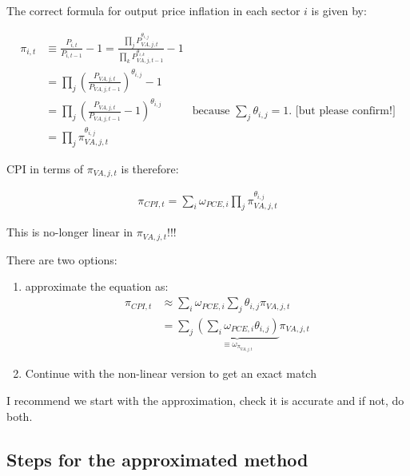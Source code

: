 \documentclass[12pt,english]{article}
\begin{document}
The correct formula for output price inflation in each sector $i$ is given by:

\begin{align*}
	\pi_{i,t} &\equiv \frac{P_{i,t}}{P_{i,t-1}}-1 = \frac{\prod_j P_{VA,j,t}^{\theta_{i,j}}}{\prod_k P_{VA,j,t-1}^{\theta_{i,k}}}-1\\
	&=\prod_j \left(\frac{P_{VA,j,t}}{P_{VA,j,t-1}}\right)^{\theta_{i,j}}-1\\
	&=\prod_j \left(\frac{P_{VA,j,t}}{P_{VA,j,t-1}}-1\right)^{\theta_{i,j}} & \text{because }\sum_j \theta_{i,j}=1\text{.  [but please confirm!]}\\
	&=\prod_j \pi_{VA,j,t}^{\theta_{i,j}}
\end{align*}

CPI in terms of $\pi_{VA,j,t}$ is therefore:

\begin{align*}
	\pi_{CPI,t} = \sum_i \omega_{PCE,i}  \prod_j \pi_{VA,j,t}^{\theta_{i,j}}
\end{align*}

This is no-longer linear in $\pi_{VA,j,t}$!!!

There are two options: 

\begin{enumerate}
\item approximate the equation as:
\begin{align*}
	\pi_{CPI,t} &\approx \sum_i \omega_{PCE,i}  \sum_j\theta_{i,j} \pi_{VA,j,t}\\
	&= \sum_j \underbrace{\left(\sum_i \omega_{PCE,i} \theta_{i,j}\right)}_{\equiv \omega_{\pi_{VA,j,t}}}\pi_{VA,j,t}
\end{align*}


\item Continue with the non-linear version to get an exact match
\end{enumerate}

I recommend we start with the approximation, check it is accurate and if not, do both.

\subsection{Steps for the approximated method}
\end{document}
